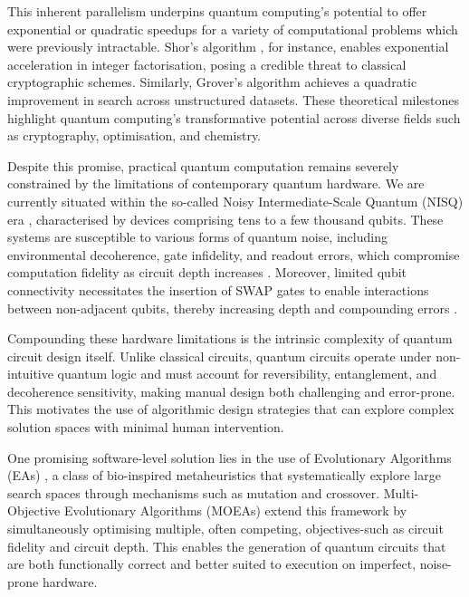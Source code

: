 \documentclass[11pt,a4paper]{article}
\begin{document}
This inherent parallelism underpins quantum computing's potential to offer exponential or quadratic speedups for a variety of computational problems which were previously intractable. Shor’s algorithm \cite{Shor365700}, for instance, enables exponential acceleration in integer factorisation, posing a credible threat to classical cryptographic schemes. Similarly, Grover’s algorithm \cite{Khanal2021QuantumML} achieves a quadratic improvement in search across unstructured datasets. These theoretical milestones highlight quantum computing’s transformative potential across diverse fields such as cryptography, optimisation, and chemistry.\newline

Despite this promise, practical quantum computation remains severely constrained by the limitations of contemporary quantum hardware. We are currently situated within the so-called Noisy Intermediate-Scale Quantum (NISQ) era \cite{Preskill2018QuantumCI}, characterised by devices comprising tens to a few thousand qubits. These systems are susceptible to various forms of quantum noise, including environmental decoherence, gate infidelity, and readout errors, which compromise computation fidelity as circuit depth increases \cite{Clerk2008IntroductionTQ}. Moreover, limited qubit connectivity necessitates the insertion of SWAP gates to enable interactions between non-adjacent qubits, thereby increasing depth and compounding errors \cite{Preskill2018QuantumCI}.\newline

Compounding these hardware limitations is the intrinsic complexity of quantum circuit design itself. Unlike classical circuits, quantum circuits operate under non-intuitive quantum logic and must account for reversibility, entanglement, and decoherence sensitivity, making manual design both challenging and error-prone. This motivates the use of algorithmic design strategies that can explore complex solution spaces with minimal human intervention.\newline

One promising software-level solution lies in the use of Evolutionary Algorithms (EAs) \cite{Lukac2002EvolvingQC}, a class of bio-inspired metaheuristics that systematically explore large search spaces through mechanisms such as mutation and crossover. Multi-Objective Evolutionary Algorithms (MOEAs) \cite{moein} extend this framework by simultaneously optimising multiple, often competing, objectives-such as circuit fidelity and circuit depth. This enables the generation of quantum circuits that are both functionally correct and better suited to execution on imperfect, noise-prone hardware.\newline
\end{document}
